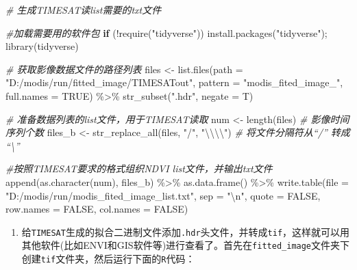 \documentclass[
]{article}
\newenvironment{Shaded}{\begin{snugshade}}{\end{snugshade}}
\newcommand{\AttributeTok}[1]{\textcolor[rgb]{0.77,0.63,0.00}{#1}}
\newcommand{\CommentTok}[1]{\textcolor[rgb]{0.56,0.35,0.01}{\textit{#1}}}
\newcommand{\ConstantTok}[1]{\textcolor[rgb]{0.00,0.00,0.00}{#1}}
\newcommand{\ControlFlowTok}[1]{\textcolor[rgb]{0.13,0.29,0.53}{\textbf{#1}}}
\newcommand{\FunctionTok}[1]{\textcolor[rgb]{0.00,0.00,0.00}{#1}}
\newcommand{\NormalTok}[1]{#1}
\newcommand{\OtherTok}[1]{\textcolor[rgb]{0.56,0.35,0.01}{#1}}
\newcommand{\SpecialCharTok}[1]{\textcolor[rgb]{0.00,0.00,0.00}{#1}}
\newcommand{\StringTok}[1]{\textcolor[rgb]{0.31,0.60,0.02}{#1}}
\providecommand{\tightlist}{%
  \setlength{\itemsep}{0pt}\setlength{\parskip}{0pt}}
\begin{document}
\begin{Shaded}
\begin{Highlighting}[]
\CommentTok{\# 生成TIMESAT读list需要的txt文件}

\CommentTok{\#加载需要用的软件包}
\ControlFlowTok{if}\NormalTok{ (}\SpecialCharTok{!}\FunctionTok{require}\NormalTok{(}\StringTok{"tidyverse"}\NormalTok{)) }\FunctionTok{install.packages}\NormalTok{(}\StringTok{"tidyverse"}\NormalTok{); }\FunctionTok{library}\NormalTok{(tidyverse)}

\CommentTok{\# 获取影像数据文件的路径列表}
\NormalTok{files }\OtherTok{\textless{}{-}} \FunctionTok{list.files}\NormalTok{(}\AttributeTok{path =} \StringTok{"D:/modis/run/fitted\_image/TIMESATout"}\NormalTok{, }
                    \AttributeTok{pattern =} \StringTok{"modis\_fited\_image\_"}\NormalTok{,}
                    \AttributeTok{full.names =} \ConstantTok{TRUE}\NormalTok{) }\SpecialCharTok{\%\textgreater{}\%} 
  \FunctionTok{str\_subset}\NormalTok{(}\StringTok{".hdr"}\NormalTok{, }\AttributeTok{negate =}\NormalTok{ T)}

\CommentTok{\# 准备数据列表的list文件，用于TIMESAT读取}
\NormalTok{num }\OtherTok{\textless{}{-}} \FunctionTok{length}\NormalTok{(files)  }\CommentTok{\# 影像时间序列个数}
\NormalTok{files\_b }\OtherTok{\textless{}{-}} \FunctionTok{str\_replace\_all}\NormalTok{(files, }\StringTok{"/"}\NormalTok{, }\StringTok{"}\SpecialCharTok{\textbackslash{}\textbackslash{}\textbackslash{}\textbackslash{}}\StringTok{"}\NormalTok{) }\CommentTok{\# 将文件分隔符从“/” 转成 “\textbackslash{}”}

\CommentTok{\#按照TIMESAT要求的格式组织NDVI list文件，并输出txt文件}
\FunctionTok{append}\NormalTok{(}\FunctionTok{as.character}\NormalTok{(num), files\_b) }\SpecialCharTok{\%\textgreater{}\%} 
  \FunctionTok{as.data.frame}\NormalTok{() }\SpecialCharTok{\%\textgreater{}\%} 
  \FunctionTok{write.table}\NormalTok{(}\AttributeTok{file =} \StringTok{"D:/modis/run/modis\_fited\_image\_list.txt"}\NormalTok{,}
              \AttributeTok{sep =} \StringTok{"}\SpecialCharTok{\textbackslash{}n}\StringTok{"}\NormalTok{, }\AttributeTok{quote =} \ConstantTok{FALSE}\NormalTok{, }
              \AttributeTok{row.names =} \ConstantTok{FALSE}\NormalTok{, }\AttributeTok{col.names =} \ConstantTok{FALSE}\NormalTok{)}
\end{Highlighting}
\end{Shaded}

\begin{enumerate}
\def\labelenumi{\arabic{enumi}.}
\setcounter{enumi}{1}
\tightlist
\item
  给\texttt{TIMESAT}生成的拟合二进制文件添加\texttt{.hdr}头文件，并转成\texttt{tif}，这样就可以用其他软件(比如ENVI和GIS软件等)进行查看了。首先在\texttt{fitted\_image}文件夹下创建\texttt{tif}文件夹，然后运行下面的\texttt{R}代码：
\end{enumerate}
\end{document}
